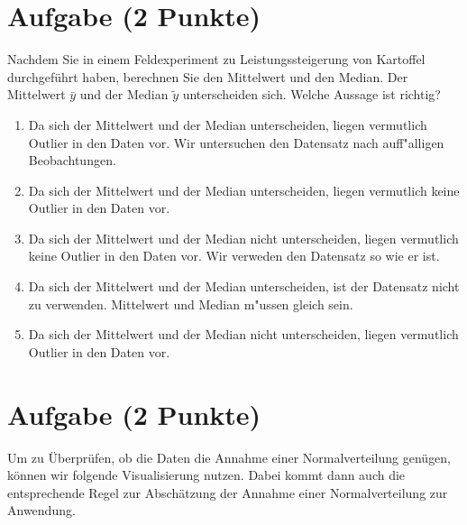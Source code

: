 \documentclass[a4paper, 9pt]{scrartcl}\usepackage[]{graphicx}\usepackage[]{xcolor}
\begin{document}
\section{Aufgabe \hfill (2 Punkte)}



Nachdem Sie in einem Feldexperiment zu Leistungssteigerung von
Kartoffel durchgef{\"u}hrt haben, berechnen Sie den Mittelwert und den
Median. Der Mittelwert $\bar{y}$ und der Median $\tilde{y}$
unterscheiden sich. Welche Aussage ist richtig?




\begin{enumerate}
\item [\textbf{A} \msquare] Da sich der Mittelwert und der Median unterscheiden, liegen vermutlich Outlier in den Daten vor. Wir untersuchen den Datensatz nach auff{"a}lligen Beobachtungen.
\item [\textbf{B} \msquare] Da sich der Mittelwert und der Median unterscheiden, liegen vermutlich keine Outlier in den Daten vor.
\item [\textbf{C} \msquare] Da sich der Mittelwert und der Median nicht unterscheiden, liegen vermutlich keine Outlier in den Daten vor. Wir verweden den Datensatz so wie er ist.
\item [\textbf{D} \msquare] Da sich der Mittelwert und der Median unterscheiden, ist der Datensatz nicht zu verwenden. Mittelwert und Median m{"u}ssen gleich sein.
\item [\textbf{E} \msquare] Da sich der Mittelwert und der Median nicht unterscheiden, liegen vermutlich Outlier in den Daten vor.
\end{enumerate}

\section{Aufgabe \hfill (2 Punkte)}



Um zu {\"U}berpr{\"u}fen, ob die Daten die Annahme einer Normalverteilung gen{\"u}gen, k{\"o}nnen
wir folgende Visualisierung nutzen. Dabei kommt dann auch die entsprechende
Regel zur Absch{\"a}tzung der Annahme einer Normalverteilung zur Anwendung. 
\end{document}
